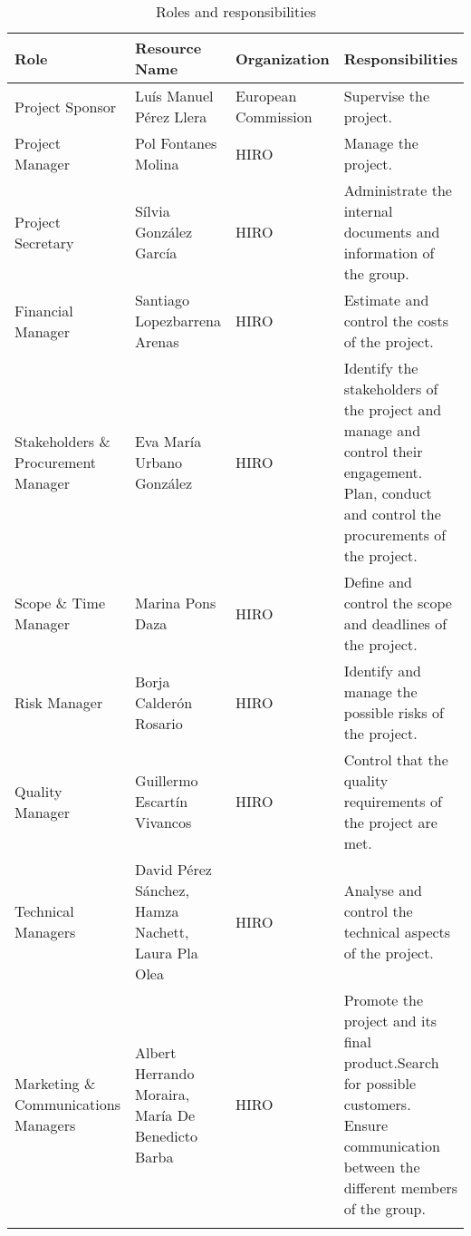 \begin{small}	
	
	\begin{longtable}{>{\raggedright\arraybackslash}p{2.5cm} >{\raggedright\arraybackslash}p{2.8cm} >{\raggedright\arraybackslash}p{2.6cm}>{\raggedright\arraybackslash}p{5.2cm}}
		
		\toprule[2pt]
		
		\textbf{Role} & \textbf{Resource Name} & \textbf{Organization} & \textbf{Responsibilities} \\ \midrule[1.5pt] 
		\endhead
		
		Project Sponsor & Luís Manuel Pérez Llera & European Commission & Supervise the project. \\ \midrule
		
		Project Manager & Pol Fontanes Molina & HIRO & Manage the project. \\ \midrule
		
		Project Secretary & Sílvia González García & HIRO & Administrate the internal documents and information of the group. \\ \midrule
		
		Financial Manager & Santiago Lopezbarrena Arenas & HIRO & Estimate and control the costs of the project. \\ \midrule
		
		Stakeholders \& Procurement Manager & Eva María Urbano González & HIRO & Identify the stakeholders of the project and manage and control their engagement.\newline 
		Plan, conduct and control the procurements of the project.\\ \midrule
		
		Scope \& Time Manager & Marina Pons Daza & HIRO & Define and control the scope and deadlines of the project. \\ \midrule
		
		Risk Manager & Borja Calderón Rosario & HIRO & Identify and manage the possible risks of the project. \\ \midrule
		
		Quality Manager & Guillermo Escartín Vivancos & HIRO & Control that the quality requirements of the project are met. \\ \midrule
		
		Technical Managers & David Pérez Sánchez, \newline  Hamza Nachett, \newline  Laura Pla Olea & HIRO & Analyse and control the technical aspects of the project. \\ \midrule
		
		Marketing \& Communications Managers & Albert Herrando Moraira, \newline  María De Benedicto Barba & HIRO & Promote the project and its final product.\newline Search for possible customers.\newline 
		Ensure communication between the different members of the group.
		\\ \bottomrule[2pt]
		\caption{Roles and responsibilities}
		\label{table_roles}	
	\end{longtable}
\end{small}


